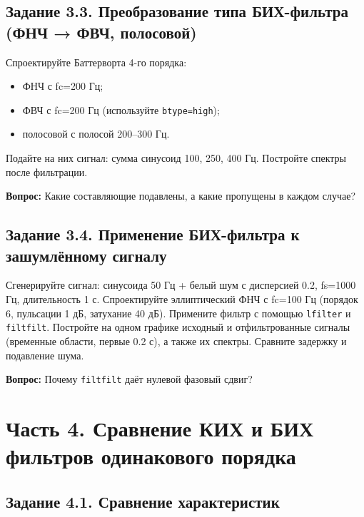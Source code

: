 \documentclass[12pt,a4paper,openany]{book}
\providecommand{\tightlist}{\setlength{\itemsep}{0pt}\setlength{\parskip}{0pt}}
\begin{document}
\subsection*{Задание 3.3. Преобразование типа БИХ-фильтра (ФНЧ → ФВЧ, полосовой)}

Спроектируйте Баттерворта 4-го порядка:

\begin{itemize}
\tightlist
\item
  ФНЧ с fc=200 Гц;
\item
  ФВЧ с fc=200 Гц (используйте \texttt{btype=\allowbreak{}\textquotesingle{}\allowbreak{}high\textquotesingle{}\allowbreak{}});
\item
  полосовой с полосой 200--300 Гц.
\end{itemize}

Подайте на них сигнал: сумма синусоид 100, 250, 400 Гц. Постройте спектры после фильтрации.

\textbf{Вопрос:} Какие составляющие подавлены, а какие пропущены в каждом случае?

\subsection*{Задание 3.4. Применение БИХ-фильтра к зашумлённому сигналу}

Сгенерируйте сигнал: синусоида 50 Гц + белый шум с дисперсией 0.2, fs=1000 Гц, длительность 1 с. Спроектируйте эллиптический ФНЧ с fc=100 Гц (порядок 6, пульсации 1 дБ, затухание 40 дБ). Примените фильтр с помощью \texttt{lfilter} и \texttt{filtfilt}. Постройте на одном графике исходный и отфильтрованные сигналы (временные области, первые 0.2 с), а также их спектры. Сравните задержку и подавление шума.

\textbf{Вопрос:} Почему \texttt{filtfilt} даёт нулевой фазовый сдвиг?

\section*{Часть 4. Сравнение КИХ и БИХ фильтров одинакового порядка}

\subsection*{Задание 4.1. Сравнение характеристик}
\end{document}
